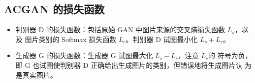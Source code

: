 \subsection{ACGAN 的损失函数}
\begin{itemize}
  \item 判别器 D 的损失函数：包括原始 GAN 中图片来源的交叉熵损失函数 $L_{s}$，以及
    图片类别的 Softmax 损失函数 $L_{c}$。判别器 D 试图最小化 $L_{s} + L_{c}$。
  \item 生成器 G 的损失函数：生成器 G 试图最大化 $L_{s} - L_{c}$，注意 $L_{c}$的
    符号为负，即 G 也试图使判别器 D 正确给出生成图片的类别，但错误地将生成图片认
    为是真实图片。
\end{itemize}



